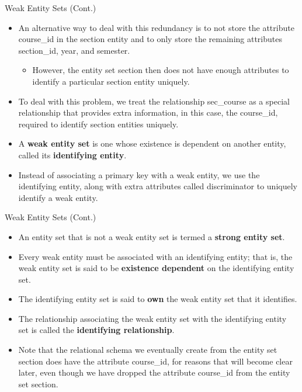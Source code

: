\documentclass{beamer}
\begin{document}
\begin{frame}{Weak Entity Sets (Cont.)}
    \begin{itemize}
        \item An alternative way to deal with this redundancy is to not store the attribute course\_id in the section entity and to only store the remaining attributes section\_id, year, and semester.
        \begin{itemize}
            \item However, the entity set section then does not have enough attributes to identify a particular section entity uniquely.
        \end{itemize}
        \item To deal with this problem, we treat the relationship sec\_course as a special relationship that provides extra information, in this case, the course\_id, required to identify section entities uniquely.
        \item A \textbf{weak entity set} is one whose existence is dependent on another entity, called its \textbf{identifying entity}.
        \item Instead of associating a primary key with a weak entity, we use the identifying entity, along with extra attributes called discriminator to uniquely identify a weak entity.
    \end{itemize}
\end{frame}

\begin{frame}{Weak Entity Sets (Cont.)}
    \begin{itemize}
        \item An entity set that is not a weak entity set is termed a \textbf{strong entity set}.
        \item Every weak entity must be associated with an identifying entity; that is, the weak entity set is said to be \textbf{existence dependent} on the identifying entity set.
        \item The identifying entity set is said to \textbf{own} the weak entity set that it identifies.
        \item The relationship associating the weak entity set with the identifying entity set is called the \textbf{identifying relationship}.
        \item Note that the relational schema we eventually create from the entity set section does have the attribute course\_id, for reasons that will become clear later, even though we have dropped the attribute course\_id from the entity set section.
    \end{itemize}
\end{frame}
\end{document}
